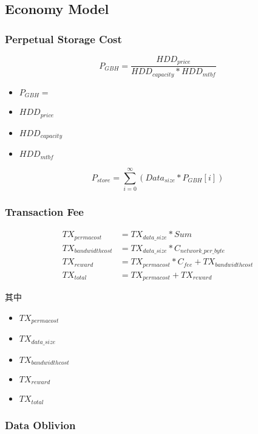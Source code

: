 \documentclass[]{article}
\begin{document}
\subsection{Economy Model}

\subsubsection{Perpetual Storage Cost}

\begin{equation}\label{CPDS}
	P_{GBH} = \frac{HDD_{price}}{HDD_{capacity} * HDD_{mtbf}}
\end{equation}

\begin{itemize}
	\item $P_{GBH} =$
	\item $HDD_{price}$
	\item $HDD_{capacity}$
	\item ${HDD_{mtbf}}$
\end{itemize}

\begin{equation}
    P_{store} = \sum_{i = 0}^{\infty} (Data_{size} * P_{GBH}[i])
\end{equation}

\subsubsection{Transaction Fee}

\begin{align}
	TX_{permacost} &= TX_{data\_size} * Sum \\
	TX_{bandwidthcost} &= TX_{data\_size} * C_{network\_per\_byte} \\
	TX_{reward} &= TX_{permacost} * C_{fee} + TX_{bandwidthcost}	\\
	TX_{total} &= TX_{permacost} + TX_{reward}
\end{align}

其中

\begin{itemize}
	\item $TX_{permacost}$
	\item $TX_{data\_size}$
	\item $TX_{bandwidthcost}$
	\item $TX_{reward}$
	\item ${TX_{total}}$
\end{itemize}

\subsubsection{Data Oblivion}
\end{document}
